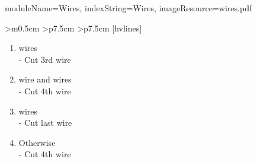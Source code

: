 \documentclass{../../ktane-mod}
\begin{document}
\begin{module}{
  moduleName=Wires,
  indexString=Wires,
  imageResource=wires.pdf
}
\begin{NiceTabular}{
    >{\centering\arraybackslash}m{0.5cm}
    >{\centering\arraybackslash}p{7.5cm}
    >{\centering\arraybackslash}p{7.5cm}
  }[hvlines]
\begin{minipage}[c][4cm][t]{\linewidth}
\begin{enumerate}[label=\alph*.,itemsep=0pt]
                         \item \YELLOW[No YELLOW] wires\\ - Cut 3rd wire
                         \item \YELLOW[1 YELLOW] wire and \WHITE[2+ WHITE] wires\\ - Cut 4th wire
                         \item \RED[No RED] wires\\ - Cut last wire
                         \item Otherwise\\ - Cut 4th wire
                       \end{enumerate}
    \end{minipage} \\
  \end{NiceTabular}
  \renewcommand{\arraystretch}{1.0}
\end{module}
\end{document}
